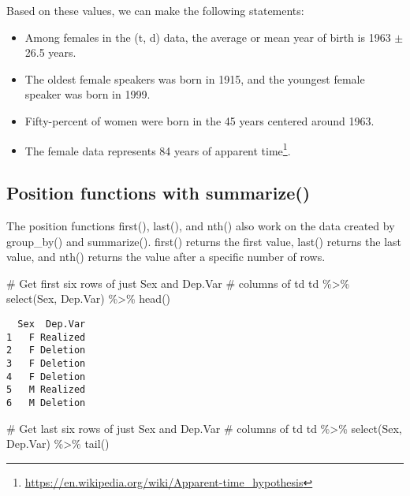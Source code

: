 \documentclass[
  12pt,
  letterpaper]{article}
\newenvironment{Shaded}{\begin{snugshade}}{\end{snugshade}}
\newcommand{\CommentTok}[1]{\textcolor[rgb]{0.37,0.37,0.37}{#1}}
\newcommand{\FunctionTok}[1]{\textcolor[rgb]{0.28,0.35,0.67}{#1}}
\newcommand{\NormalTok}[1]{\textcolor[rgb]{0.00,0.23,0.31}{#1}}
\newcommand{\SpecialCharTok}[1]{\textcolor[rgb]{0.37,0.37,0.37}{#1}}
\renewcommand\texttt[1]{{\ttfamily\color{BrickRed}#1}}
\DeclareRobustCommand{\href}[2]{#2\footnote{\url{#1}}}
\begin{document}
Based on these values, we can make the following statements:

\begin{itemize}
\item
  Among females in the (t, d) data, the average or mean year of birth is
  1963 \(\pm\) 26.5 years.
\item
  The oldest female speakers was born in 1915, and the youngest female
  speaker was born in 1999.
\item
  Fifty-percent of women were born in the 45 years centered around 1963.
\item
  The female data represents 84 years of
  \href{https://en.wikipedia.org/wiki/Apparent-time_hypothesis}{apparent
  time}.
\end{itemize}

\hypertarget{position-functions-with-summarize}{%
\subsection{\texorpdfstring{Position functions with
\texttt{summarize()}}{Position functions with summarize()}}\label{position-functions-with-summarize}}

The position functions \texttt{first()}, \texttt{last()}, and
\texttt{nth()} also work on the data created by \texttt{group\_by()} and
\texttt{summarize()}. \texttt{first()} returns the first value,
\texttt{last()} returns the last value, and \texttt{nth()} returns the
value after a specific number of rows.

\begin{Shaded}
\begin{Highlighting}[]
\CommentTok{\# Get first six rows of just Sex and Dep.Var}
\CommentTok{\# columns of td}
\NormalTok{td }\SpecialCharTok{\%\textgreater{}\%}
    \FunctionTok{select}\NormalTok{(Sex, Dep.Var) }\SpecialCharTok{\%\textgreater{}\%}
    \FunctionTok{head}\NormalTok{()}
\end{Highlighting}
\end{Shaded}

\begin{verbatim}
  Sex  Dep.Var
1   F Realized
2   F Deletion
3   F Deletion
4   F Deletion
5   M Realized
6   M Deletion
\end{verbatim}

\begin{Shaded}
\begin{Highlighting}[]
\CommentTok{\# Get last six rows of just Sex and Dep.Var}
\CommentTok{\# columns of td}
\NormalTok{td }\SpecialCharTok{\%\textgreater{}\%}
    \FunctionTok{select}\NormalTok{(Sex, Dep.Var) }\SpecialCharTok{\%\textgreater{}\%}
    \FunctionTok{tail}\NormalTok{()}
\end{Highlighting}
\end{Shaded}
\end{document}
